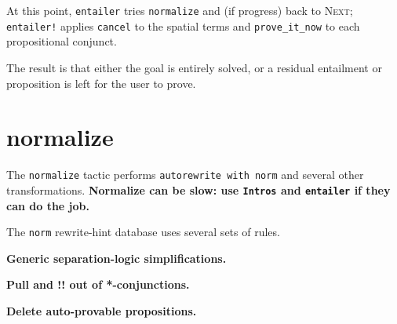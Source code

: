 \documentclass[12pt,fleqn,openany,oneside,showtrims]{memoir}
\begin{document}
At this point, \lstinline{entailer} tries \lstinline{normalize} and (if progress) back to \textsc{Next;} \lstinline{entailer!} applies \lstinline{cancel} to the spatial terms and \lstinline{prove_it_now} to each propositional conjunct.

The result is that either the goal is entirely solved, or a residual entailment or proposition is left for the user to prove.

\chapter{normalize}
\label{refcard:normalize}
The \lstinline{normalize} tactic performs
\lstinline{autorewrite with norm} and several other transformations.
\textbf{Normalize can be slow:
  use \lstinline{Intros} and \lstinline{entailer}
  if they can do the job.}

The \lstinline{norm} rewrite-hint database uses several sets of rules.

\textbf{Generic separation-logic simplifications.}
\textbf{Pull \EX and !! out of *-conjunctions.}
\textbf{Delete auto-provable propositions.}
\end{document}
